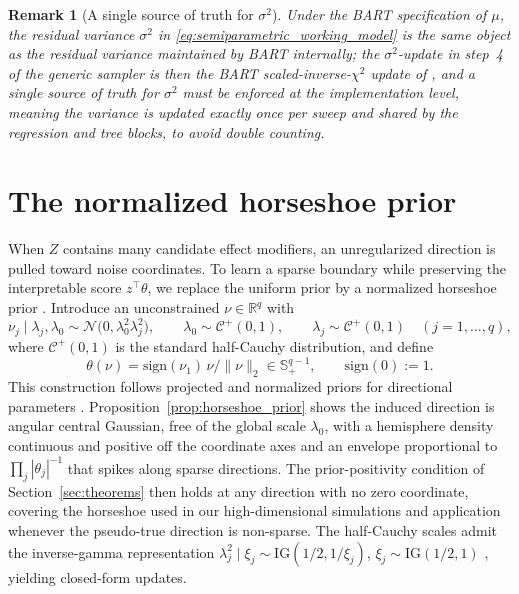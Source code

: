 \documentclass[11pt]{article}
\theoremstyle{definition}
\theoremstyle{plain}
\newtheorem{remark}{Remark}
\newcommand{\R}{\mathbb{R}}
\begin{document}
\begin{remark}[A single source of truth for $\sigma^2$]
\label{rem:sigma_single_source}
Under the BART specification of $\mu$, the residual variance $\sigma^2$ in \eqref{eq:semiparametric_working_model} is the same object as the residual variance maintained by BART internally; the $\sigma^2$-update in step~4 of the generic sampler is then the BART scaled-inverse-$\chi^2$ update of \citet{Chipman2010}, and a single source of truth for $\sigma^2$ must be enforced at the implementation level, meaning the variance is updated exactly once per sweep and shared by the regression and tree blocks, to avoid double counting.
\end{remark}

\section{The normalized horseshoe prior}\label{sec:horseshoe_construction}

When $Z$ contains many candidate effect modifiers, an unregularized direction is pulled toward noise coordinates. To learn a sparse boundary while preserving the interpretable score $z^\top\theta$, we replace the uniform prior by a normalized horseshoe prior \citep{Carvalho2009}. Introduce an unconstrained $\nu\in\R^q$ with
\begin{equation}
\nu_j \mid \lambda_j,\lambda_0 \sim \mathcal N\big(0,\lambda_0^2\lambda_j^2\big),\qquad
\lambda_0\sim\mathcal C^+(0,1),\qquad \lambda_j\sim\mathcal C^+(0,1)\quad (j=1,\dots,q),
\label{eq:horseshoe}
\end{equation}
where $\mathcal C^+(0,1)$ is the standard half-Cauchy distribution, and define
\[
\theta(\nu)=\mathrm{sign}(\nu_1)\,\nu/\|\nu\|_2\in\mathbb S^{q-1}_+,\qquad \mathrm{sign}(0):=1.
\]
This construction follows projected and normalized priors for directional parameters \citep{Presnell1998,Antoniadis2004}. Proposition~\ref{prop:horseshoe_prior} shows the induced direction is angular central Gaussian, free of the global scale $\lambda_0$, with a hemisphere density continuous and positive off the coordinate axes and an envelope proportional to $\prod_j|\theta_j|^{-1}$ that spikes along sparse directions. The prior-positivity condition of Section~\ref{sec:theorems} then holds at any direction with no zero coordinate, covering the horseshoe used in our high-dimensional simulations and application whenever the pseudo-true direction is non-sparse. The half-Cauchy scales admit the inverse-gamma representation $\lambda_j^2\mid\xi_j\sim\mathrm{IG}(1/2,1/\xi_j)$, $\xi_j\sim\mathrm{IG}(1/2,1)$ \citep{MakalicSchmidt2016}, yielding closed-form updates.
\end{document}
